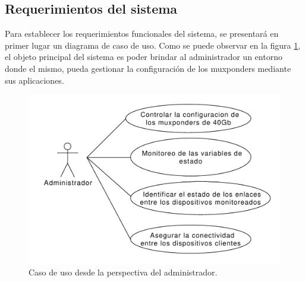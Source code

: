 \subsection{Requerimientos del sistema}

Para establecer los requerimientos funcionales del sistema, se presentará en primer lugar un diagrama de caso de uso. Como se puede observar en la figura \ref{fig:caso_uso_admin}, el objeto principal del sistema es poder brindar al administrador un entorno donde el mismo, pueda gestionar la configuración de los muxponders mediante sus aplicaciones.

\begin{figure}[H]
    \centering
    \includegraphics[scale=0.55]{Figures/caso_uso_admin.pdf}
    \caption{Caso de uso desde la perspectiva del administrador.}
    \label{fig:caso_uso_admin}
  \end{figure}

